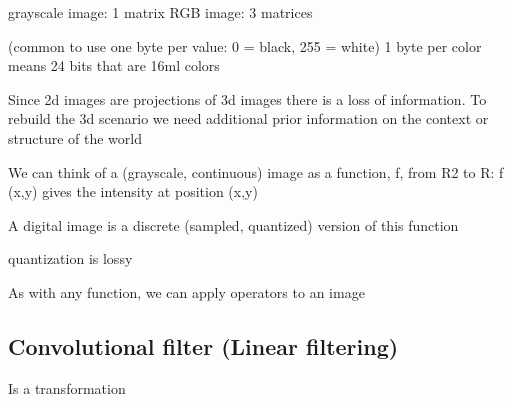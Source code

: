 grayscale image: 1 matrix
RGB image: 3 matrices

(common to use one byte per value: 0 = black, 255 = white)
1 byte per color means 24 bits that are 16ml colors

Since 2d images are projections of 3d images there is a loss of information. To rebuild the 3d scenario we need additional prior information on the context or structure of the world


We can think of a (grayscale, continuous)
image as a function, f, from R2 to R:
f (x,y) gives the intensity at position (x,y)


A digital image is a discrete (sampled, quantized)
version of this function

quantization is lossy

As with any function, we can apply operators to
an image

\subsection{Convolutional filter (Linear filtering)}
Is a transformation

